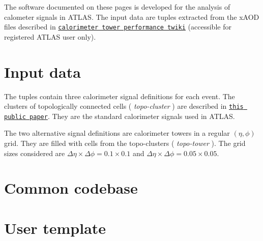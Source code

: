 The software documented on these pages is developed for the analysis of calometer signals in A\+T\+L\+AS. The input data are tuples extracted from the x\+A\+OD files described in \href{https://twiki.cern.ch/twiki/bin/view/AtlasSandboxProtected/CaloTowerPerformance}{\tt calorimeter tower performance twiki} (accessible for registered A\+T\+L\+AS user only).\hypertarget{index_m0}{}\section{Input data}\label{index_m0}
The tuples contain three calorimeter signal definitions for each event. The clusters of topologically connected cells ( {\itshape topo-\/cluster} ) are described in \href{https://link.springer.com/article/10.1140%2Fepjc%2Fs10052-017-5004-5}{\tt this public paper}. They are the standard calorimeter signals used in A\+T\+L\+AS.

The two alternative signal definitions are calorimeter towers in a regular $ (\eta,\phi) $ grid. They are filled with cells from the topo-\/clusters ( {\itshape topo-\/tower} ). The grid sizes considered are $ \Delta\eta\times\Delta\phi = 0.1\times 0.1 $ and $ \Delta\eta\times\Delta\phi = 0.05\times 0.05 $.\hypertarget{index_m1}{}\section{Common codebase}\label{index_m1}
\hypertarget{index_m2}{}\section{User template}\label{index_m2}
